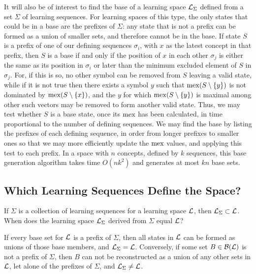 \documentclass[11pt]{llncs}
\begin{document}
{It will also be of interest to find the base of a learning space ${\cal L}_\Sigma$ defined from a set $\Sigma$ of learning sequences. For learning spaces of this type, the only states that could be in a base are the prefixes of $\Sigma$: any state that is not a prefix can be formed as a union of smaller sets, and therefore cannot be in the base.
If state $S$ is a prefix of one of our defining sequences $\sigma_i$, with $x$ as the latest concept in that prefix, then $S$ is a base if and only if the position of $x$ in each other $\sigma_j$ is either the same as its position in $\sigma_i$ or later than the minimum excluded element of $S$ in $\sigma_j$.
For, if this is so, no other symbol can be removed from $S$ leaving a valid state, while if it is not true
then there exists a symbol $y$ such that ${\rm mex}(S\setminus\{y\})$ is not dominated by ${\rm mex}(S\setminus\{x\})$, and the $y$ for which  ${\rm mex}(S\setminus\{y\})$ is maximal among other such vectors may be removed to form another valid state.
Thus, we may test whether $S$ is a base state, once its ${\rm mex}$ has been calculated,
in time proportional to the number of defining sequences.
We may find the base by listing the prefixes of each defining sequence, in order from longer prefixes to smaller ones so that we may more efficiently update the ${\rm mex}$ values, and applying this test to each prefix. In a space with $n$ concepts, defined by $k$ sequences, this base generation algorithm takes time $O(nk^2)$ and generates at most $kn$ base sets.

\subsection{Which Learning Sequences Define the Space?}

If $\Sigma$ is a collection of learning sequences for a learning space $\cal L$,
then ${\cal L}_\Sigma\subset{\cal L}$.  When does the learning space ${\cal L}_\Sigma$ derived from $\Sigma$ equal ${\cal L}$?

If every base set for $\cal L$ is a prefix of $\Sigma$, then all states in $\cal L$ can be formed as unions of those base members, and ${\cal L}_\Sigma={\cal L}$.  Conversely, if some set $B\in{\cal B}({\cal L})$ is not a prefix of $\Sigma$,
then $B$ can not be reconstructed as a union of any other sets in $\cal L$, let alone of the prefixes of $\Sigma$, and ${\cal L}_\Sigma\ne{\cal L}$.

}
\end{document}
